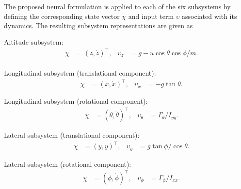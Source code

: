 \documentclass[conference]{IEEEtran}
\begin{document}
The proposed neural formulation is applied to each of the six subsystems by defining the corresponding state vector $\chi$ and input term $\upsilon$ associated with its dynamics. The resulting subsystem representations are given as

Altitude subsystem:
\begin{equation*}
\begin{aligned}
& & \chi&=(z,\dot z)^\top, & \upsilon_z&=g-{u}\cos\theta\cos\phi/m.\\
\end{aligned}
\end{equation*}

Longitudinal subsystem (translational component):
\begin{equation*}
\begin{aligned}
& & \chi&=(x,\dot x)^\top, & \upsilon_x&=-g\tan\theta.
\end{aligned}
\end{equation*}

Longitudinal subsystem (rotational component):
\begin{equation*}
\begin{aligned}
& & \chi&=(\theta,\dot\theta)^\top, & \upsilon_\theta&=\Gamma_\theta/I_{yy}.
\end{aligned}
\end{equation*}

Lateral subsystem (translational component):
\begin{equation*}
\begin{aligned}
& & \chi&=(y,\dot y)^\top, & \upsilon_y&=g\tan\phi/\cos\theta.
\end{aligned}
\end{equation*}

Lateral subsystem (rotational component):
\begin{equation*}
\begin{aligned}
& & \chi&=(\phi,\dot\phi)^\top, & \upsilon_\phi&=\Gamma_\phi/I_{xx}.
\end{aligned}
\end{equation*}
\end{document}
